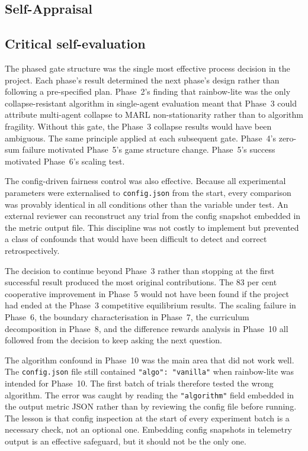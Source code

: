 \begin{appendices}
\pagestyle{plain}

\chapter{Self-Appraisal}
\label{appendix:selfappraisal}

\section{Critical self-evaluation}

The phased gate structure was the single most effective process decision in the project. Each phase's result determined the next phase's design rather than following a pre-specified plan. Phase~2's finding that rainbow-lite was the only collapse-resistant algorithm in single-agent evaluation meant that Phase~3 could attribute multi-agent collapse to MARL non-stationarity rather than to algorithm fragility. Without this gate, the Phase~3 collapse results would have been ambiguous. The same principle applied at each subsequent gate. Phase~4's zero-sum failure motivated Phase~5's game structure change. Phase~5's success motivated Phase~6's scaling test.

The config-driven fairness control was also effective. Because all experimental parameters were externalised to \texttt{config.json} from the start, every comparison was provably identical in all conditions other than the variable under test. An external reviewer can reconstruct any trial from the config snapshot embedded in the metric output file. This discipline was not costly to implement but prevented a class of confounds that would have been difficult to detect and correct retrospectively.

The decision to continue beyond Phase~3 rather than stopping at the first successful result produced the most original contributions. The 83 per cent cooperative improvement in Phase~5 would not have been found if the project had ended at the Phase~3 competitive equilibrium results. The scaling failure in Phase~6, the boundary characterisation in Phase~7, the curriculum decomposition in Phase~8, and the difference rewards analysis in Phase~10 all followed from the decision to keep asking the next question.

The algorithm confound in Phase~10 was the main area that did not work well. The \texttt{config.json} file still contained \texttt{"algo": "vanilla"} when rainbow-lite was intended for Phase~10. The first batch of trials therefore tested the wrong algorithm. The error was caught by reading the \texttt{"algorithm"} field embedded in the output metric JSON rather than by reviewing the config file before running. The lesson is that config inspection at the start of every experiment batch is a necessary check, not an optional one. Embedding config snapshots in telemetry output is an effective safeguard, but it should not be the only one.


\end{appendices}
